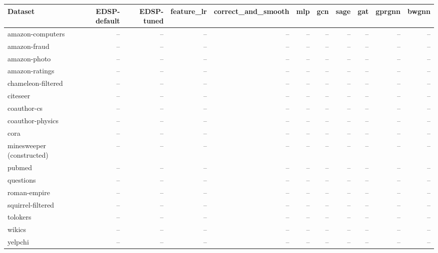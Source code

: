 \begin{tabular}{lrrrrrrrrrr}
\toprule
Dataset & EDSP-default & EDSP-tuned & feature\_lr & correct\_and\_smooth & mlp & gcn & sage & gat & gprgnn & bwgnn \\
\midrule
amazon-computers & -- & -- & -- & -- & -- & -- & -- & -- & -- & -- \\
amazon-fraud & -- & -- & -- & -- & -- & -- & -- & -- & -- & -- \\
amazon-photo & -- & -- & -- & -- & -- & -- & -- & -- & -- & -- \\
amazon-ratings & -- & -- & -- & -- & -- & -- & -- & -- & -- & -- \\
chameleon-filtered & -- & -- & -- & -- & -- & -- & -- & -- & -- & -- \\
citeseer & -- & -- & -- & -- & -- & -- & -- & -- & -- & -- \\
coauthor-cs & -- & -- & -- & -- & -- & -- & -- & -- & -- & -- \\
coauthor-physics & -- & -- & -- & -- & -- & -- & -- & -- & -- & -- \\
cora & -- & -- & -- & -- & -- & -- & -- & -- & -- & -- \\
minesweeper (constructed) & -- & -- & -- & -- & -- & -- & -- & -- & -- & -- \\
pubmed & -- & -- & -- & -- & -- & -- & -- & -- & -- & -- \\
questions & -- & -- & -- & -- & -- & -- & -- & -- & -- & -- \\
roman-empire & -- & -- & -- & -- & -- & -- & -- & -- & -- & -- \\
squirrel-filtered & -- & -- & -- & -- & -- & -- & -- & -- & -- & -- \\
tolokers & -- & -- & -- & -- & -- & -- & -- & -- & -- & -- \\
wikics & -- & -- & -- & -- & -- & -- & -- & -- & -- & -- \\
yelpchi & -- & -- & -- & -- & -- & -- & -- & -- & -- & -- \\
\bottomrule
\end{tabular}
